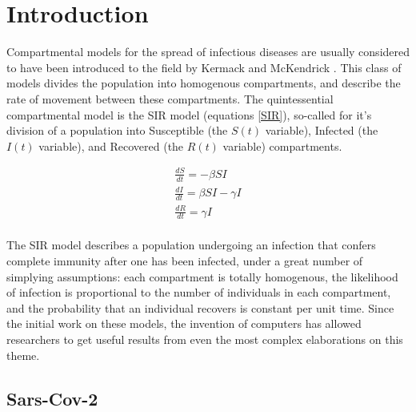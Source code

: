 \chapter{Introduction}





Compartmental models for the spread of infectious diseases are usually considered to have been introduced to the field by Kermack and McKendrick \cite{kermack1927contribution, edelstein2005mathematical}. This class of models divides the population into homogenous compartments, and describe the rate of movement between these compartments. The quintessential compartmental model is the SIR model (equations \ref{SIR}), so-called for it's division of a population into Susceptible (the $S(t)$ variable), Infected (the $I(t)$ variable), and Recovered (the $R(t)$ variable) compartments.

\begin{eqnarray}
    \frac{dS}{dt} = -\beta S I  \\
    \frac{dI}{dt} = \beta S I - \gamma I\\
    \frac{dR}{dt} = \gamma I\\
    \label{SIR}
\end{eqnarray}

The SIR model describes a population undergoing an infection that confers complete immunity after one has been infected, under a great number of simplying assumptions: each compartment is totally homogenous, the likelihood of infection is proportional to the number of individuals in each compartment, and the probability that an individual recovers is constant per unit time. Since the initial work on these models, the invention of computers has allowed researchers to get useful results from even the most complex elaborations on this theme. 



\section{Sars-Cov-2}

